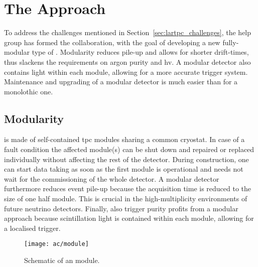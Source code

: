 \section{The \AC{} Approach}
\label{sec:ac_argoncube}

To address the challenges mentioned in Section~\ref{sec:lartpc_challenges}, the \gls{help} group has formed the \AC{} collaboration, with the goal of developing a new fully-modular type of \lartpc{}.
Modularity reduces pile-up and allows for shorter drift-times, thus slackens the requirements on argon purity and \gls{hv}.
A modular detector also contains light within each module, allowing for a more accurate trigger system.
Maintenance and upgrading of a modular detector is much easier than for a monolothic one.


\subsection{Modularity}
\label{sec:ac_argoncube_mod}

\AC{} is made of self-contained \gls{tpc} modules sharing a common cryostat.
In case of a fault condition the affected module(s) can be shut down and repaired or replaced individually without affecting the rest of the detector.
During construction, one can start data taking as soon as the first module is operational and needs not wait for the commissioning of the whole detector.
A modular detector furthermore reduces event pile-up because the acquisition time is reduced to the size of one half module.
This is crucial in the high-multiplicity environments of future \lar{} neutrino detectors.
Finally, also trigger purity profits from a modular approach because scintillation light is contained within each module, allowing for a localised trigger.

\begin{figure}[htb]
	\centering
	\texttt{[image: ac/module]}
	\caption[\AC{} module schematic]{%
		Schematic of an \AC{} module.
	}
	\label{fig:ac_module}
\end{figure}

